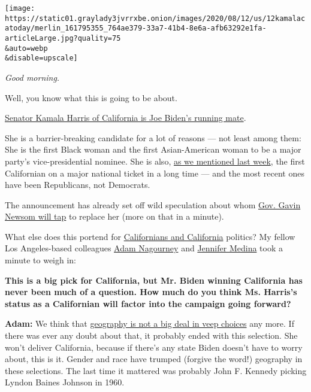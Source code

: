 \texttt{[image: https://static01.graylady3jvrrxbe.onion/images/2020/08/12/us/12kamalacatoday/merlin\_161795355\_764ae379-33a7-41b4-8e6a-afb63292e1fa-articleLarge.jpg?quality=75\\\&auto=webp\\\&disable=upscale]}

\emph{Good morning.}

Well, you know what this is going to be about.

\href{https://www.nytimes3xbfgragh.onion/2020/08/11/us/politics/kamala-harris-vp-biden.html}{Senator
Kamala Harris of California is Joe Biden's running mate}.

She is a barrier-breaking candidate for a lot of reasons --- not least
among them: She is the first Black woman and the first Asian-American
woman to be a major party's vice-presidential nominee. She is also,
\href{https://www.nytimes3xbfgragh.onion/2020/08/04/us/biden-vp-karen-bass-kamala-harris.html}{as
we mentioned last week}, the first Californian on a major national
ticket in a long time --- and the most recent ones have been
Republicans, not Democrats.

The announcement has already set off wild speculation about whom
\href{https://calmatters.org/politics/2020/08/kamala-harris-replacement-newsom-california-senate/}{Gov.
Gavin Newsom will tap} to replace her (more on that in a minute).

What else does this portend for
\href{https://www.nytimes3xbfgragh.onion/2020/08/11/us/politics/harris-biden-geography-balance.html}{Californians
and California} politics? My fellow Los Angeles-based colleagues
\href{https://www.nytimes3xbfgragh.onion/by/adam-nagourney}{Adam
Nagourney} and
\href{https://www.nytimes3xbfgragh.onion/by/jennifer-medina}{Jennifer
Medina} took a minute to weigh in:

\textbf{This is a big pick for California, but Mr. Biden winning
California has never been much of a question. How much do you think Ms.
Harris's status as a Californian will factor into the campaign going
forward?}

\textbf{Adam:} We think that
\href{https://www.nytimes3xbfgragh.onion/2020/08/11/us/politics/harris-biden-geography-balance.html}{geography
is not a big deal in veep choices} any more. If there was ever any doubt
about that, it probably ended with this selection. She won't deliver
California, because if there's any state Biden doesn't have to worry
about, this is it. Gender and race have trumped (forgive the word!)
geography in these selections. The last time it mattered was probably
John F. Kennedy picking Lyndon Baines Johnson in 1960.

